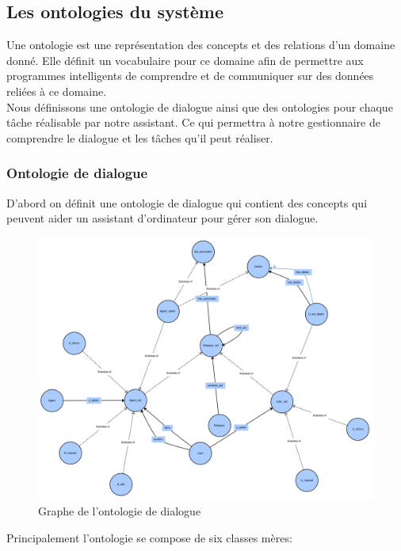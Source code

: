 \subsection{Les ontologies du système}\label{onto}
Une ontologie est une représentation des concepts et des relations d'un domaine donné. Elle définit un vocabulaire pour ce domaine afin de permettre aux programmes intelligents de comprendre  et de communiquer sur des données reliées à ce domaine.\\
Nous définissons une ontologie de dialogue ainsi que des ontologies pour chaque tâche réalisable par notre assistant. Ce qui permettra à notre gestionnaire de comprendre le dialogue et les tâches qu'il peut réaliser.
\subsubsection{Ontologie de dialogue}\label{onto1}
D'abord on définit une ontologie de dialogue qui contient des concepts qui peuvent aider un assistant d'ordinateur pour gérer son dialogue.
\begin{figure}[H] 
	
	\centering
	\includegraphics[width=0.95\linewidth]{images/Conception/DM/main_onto.png}
	\caption{Graphe de l'ontologie de dialogue}
\end{figure}\label{mail_onto}
Principalement l'ontologie se compose de six classes mères:
